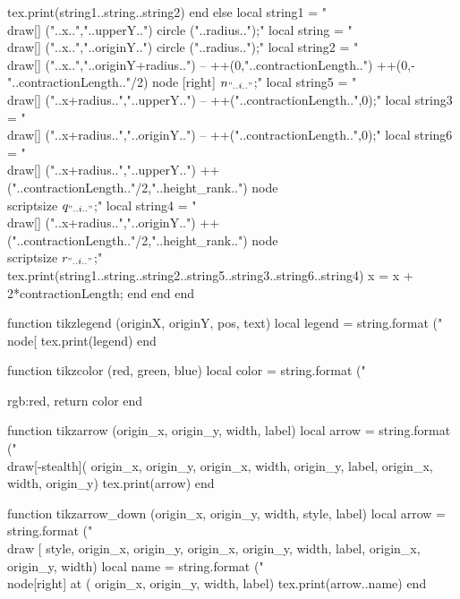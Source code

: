 \begin{luacode*}
						tex.print(string1..string..string2)
				 end
			else
				 local string1 = "\\draw[] ("..x..","..upperY..") circle ("..radius..");"
				 local string = "\\draw[] ("..x..","..originY..") circle ("..radius..");"
				 local string2 = "\\draw[] ("..x..","..originY+radius..") -- ++(0,"..contractionLength..") ++(0,-"..contractionLength.."/2) node [right] {$n_{"..i.."}$};"
				 local string5 = "\\draw[] ("..x+radius..","..upperY..") -- ++("..contractionLength..",0);"
				 local string3 = "\\draw[] ("..x+radius..","..originY..") -- ++("..contractionLength..",0);"
				 local string6 = "\\draw[] ("..x+radius..","..upperY..") ++("..contractionLength.."/2,"..height_rank..") node {\\scriptsize $q_{"..i.."}$};"
				 local string4 = "\\draw[] ("..x+radius..","..originY..") ++("..contractionLength.."/2,"..height_rank..") node {\\scriptsize $r_{"..i.."}$};"
				 tex.print(string1..string..string2..string5..string3..string6..string4)
				 x = x + 2*contractionLength;
			end
	 end
end

function tikzlegend (originX, originY, pos, text)
	 local legend = string.format ("\\node[%
	 tex.print(legend)
end

function tikzcolor (red, green, blue)
	 local color = string.format ("{rgb:red,%
	 return color
end

function tikzarrow (origin_x, origin_y, width, label)
	 local arrow = string.format ("\\draw[-stealth](%
																origin_x, origin_y, origin_x, width, origin_y, label, origin_x, width, origin_y)
	 tex.print(arrow)
end

function tikzarrow_down (origin_x, origin_y, width, style, label)
	 local arrow = string.format ("\\draw [%
																style, origin_x, origin_y, origin_x, origin_y, width, label, origin_x, origin_y, width)
	 local name = string.format ("\\node[right] at (%
															 origin_x, origin_y, width, label)
	 tex.print(arrow..name)
end

}
\end{luacode*}
